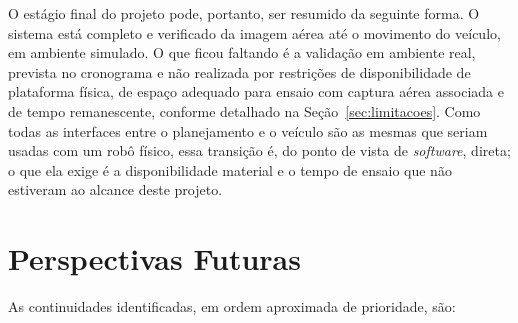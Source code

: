 \documentclass[
    12pt,
    openright,
    oneside,
    a4paper,
    english,
    brazil
]{abntex2}
\begin{document}
O estágio final do projeto pode, portanto, ser resumido da seguinte forma. O sistema está completo e verificado da imagem aérea até o movimento do veículo, em ambiente simulado. O que ficou faltando é a validação em ambiente real, prevista no cronograma e não realizada por restrições de disponibilidade de plataforma física, de espaço adequado para ensaio com captura aérea associada e de tempo remanescente, conforme detalhado na Seção~\ref{sec:limitacoes}. Como todas as interfaces entre o planejamento e o veículo são as mesmas que seriam usadas com um robô físico, essa transição é, do ponto de vista de \textit{software}, direta; o que ela exige é a disponibilidade material e o tempo de ensaio que não estiveram ao alcance deste projeto.

\section{Perspectivas Futuras}

As continuidades identificadas, em ordem aproximada de prioridade, são:
\end{document}
